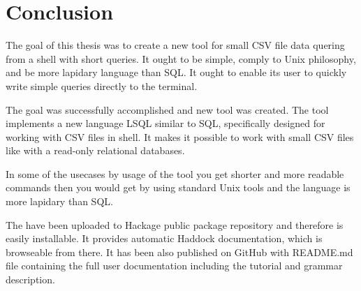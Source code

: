 \chapter*{Conclusion}

The goal of this thesis was to create a new tool for small CSV file data quering from a shell with short queries.
It ought to be simple, comply to Unix philosophy, and be more lapidary language than SQL.
It ought to enable its user to quickly write simple queries directly to the terminal.

The goal was successfully accomplished and new tool  was created. The tool implements a new language LSQL similar to
SQL, specifically designed for working with CSV files in shell. It makes it possible to work with small CSV files like with a read-only relational databases.

In some of the usecases by usage of the tool you get shorter and more readable commands then you would get by using standard Unix tools and the 
language is more lapidary than SQL.

The  have been uploaded to Hackage public package repository and therefore is easily installable. 
It provides automatic Haddock documentation, which is browseable from there. 
It has been also published on GitHub with README.md file containing the full user documentation including the tutorial and grammar description.

